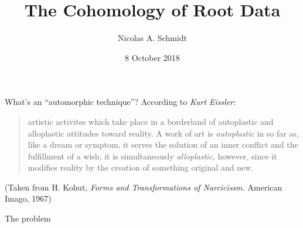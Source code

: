 \documentclass[pdf]{beamer}
\title{The Cohomology of Root Data}
\author{Nicolas A. Schmidt}
\date{8 October 2018}
\begin{document}
\begin{frame}
   \titlepage
\end{frame}

\begin{frame}{What's an ``automorphic technique''?}
   \pause
   According to \textit{Kurt Eissler}:
  \pause
   \blockquote[]{
       artistic activites which take place in a borderland of autoplastic and alloplastic attitudes toward reality. A work of art \textelp{} is \textit{autoplastic} in so far as, like a dream or symptom, it serves the {solution of an inner conflict and the fulfillment of a wish}; it is simultaneously \textit{alloplastic}, however, since it modifies reality by the {creation of something original and new}.
   }
   (Taken from H. Kohut, \textit{Forms and Transformations of Narcicissm.} American Imago, 1967)
\end{frame}

\begin{frame}{The problem}
\end{frame}
\end{document}

